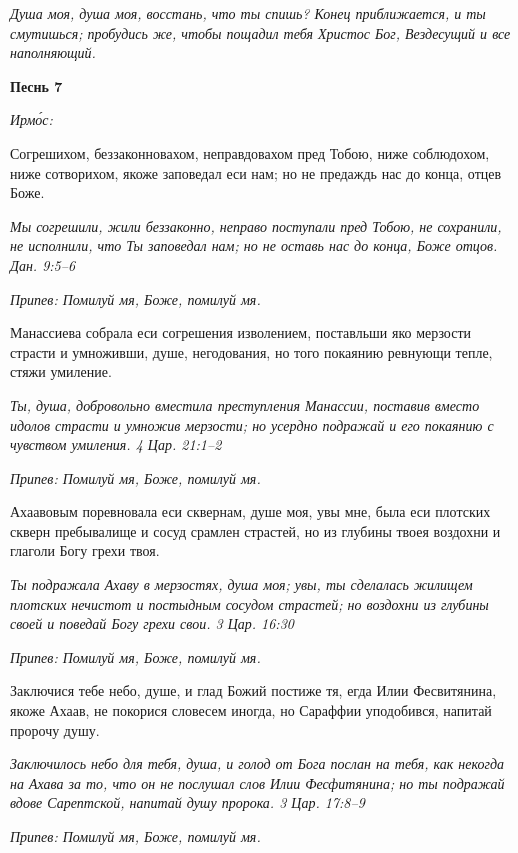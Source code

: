 \itshape Душа моя, душа моя, восстань, что ты спишь? Конец приближается, и ты смутишься; пробудись же, чтобы пощадил тебя Христос Бог, Вездесущий и все наполняющий.\normalfont{}





\bfseries Песнь 7\normalfont{}


\itshape Ирмо́с:\normalfont{}


Согрешихом, беззаконновахом, неправдовахом пред Тобою, ниже соблюдохом, ниже сотворихом, якоже заповедал еси нам; но не предаждь нас до конца, отцев Боже.


\itshape Мы согрешили, жили беззаконно, неправо поступали пред Тобою, не сохранили, не исполнили, что Ты заповедал нам; но не оставь нас до конца, Боже отцов. Дан. 9:5–6\normalfont{}


\itshape Припев:\normalfont{} Помилуй мя, Боже, помилуй мя.


Манассиева собрала еси согрешения изволением, поставльши яко мерзости страсти и умноживши, душе, негодования, но того покаянию ревнующи тепле, стяжи умиление.


\itshape Ты, душа, добровольно вместила преступления Манассии, поставив вместо идолов страсти и умножив мерзости; но усердно подражай и его покаянию с чувством умиления. 4 Цар. 21:1–2\normalfont{}


\itshape Припев:\normalfont{} Помилуй мя, Боже, помилуй мя.


Ахаавовым поревновала еси сквернам, душе моя, увы мне, была еси плотских скверн пребывалище и сосуд срамлен страстей, но из глубины твоея воздохни и глаголи Богу грехи твоя.


\itshape Ты подражала Ахаву в мерзостях, душа моя; увы, ты сделалась жилищем плотских нечистот и постыдным сосудом страстей; но воздохни из глубины своей и поведай Богу грехи свои. 3 Цар. 16:30\normalfont{}


\itshape Припев:\normalfont{} Помилуй мя, Боже, помилуй мя.


Заключися тебе небо, душе, и глад Божий постиже тя, егда Илии Фесвитянина, якоже Ахаав, не покорися словесем иногда, но Сараффии уподобився, напитай пророчу душу.


\itshape Заключилось небо для тебя, душа, и голод от Бога послан на тебя, как некогда на Ахава за то, что он не послушал слов Илии Фесфитянина; но ты подражай вдове Сарептской, напитай душу пророка. 3 Цар. 17:8–9\normalfont{}


\itshape Припев:\normalfont{} Помилуй мя, Боже, помилуй мя.


